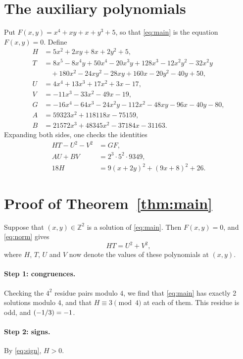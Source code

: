 \documentclass[11pt]{article}
\newcommand{\Z}{\mathbb{Z}}
\newcommand{\leg}[2]{\mathchoice{\biggl(\dfrac{#1}{#2}\biggr)}{(#1/#2)}{(#1/#2)}{(#1/#2)}}
\begin{document}
\section{The auxiliary polynomials}

Put $F(x,y)=x^{4}+xy+x+y^{3}+5$, so that \eqref{eq:main} is the equation $F(x,y)=0$. Define
\begin{align*}
H&=5x^{2}+2xy+8x+2y^{2}+5,\\
T&=8x^{5}-8x^{4}y+50x^{4}-20x^{3}y+128x^{3}-12x^{2}y^{2}-32x^{2}y\\
&\quad+180x^{2}-24xy^{2}-28xy+160x-20y^{2}-40y+50,\\
U&=4x^{4}+13x^{3}+17x^{2}+3x-17,\\
V&=-11x^{3}-33x^{2}-49x-19,\\
G&=-16x^{4}-64x^{3}-24x^{2}y-112x^{2}-48xy-96x-40y-80,\\
A&=59323x^{2}+118118x-75159,\\
B&=21572x^{3}+48345x^{2}-37184x-31163.
\end{align*}
Expanding both sides, one checks the identities
\begin{align}
HT-U^2-V^2&=GF,\label{eq:norm}\\
AU+BV&=2^{3}\cdot 5^{2}\cdot 9349,\label{eq:bezout}\\
18H&=9(x+2y)^2+(9x+8)^2+26.\label{eq:sign}
\end{align}

\section{Proof of Theorem~\ref{thm:main}}

Suppose that $(x,y)\in\Z^2$ is a solution of \eqref{eq:main}. Then $F(x,y)=0$, and \eqref{eq:norm} gives
\begin{equation}\label{eq:HT}
HT=U^2+V^2,
\end{equation}
where $H$, $T$, $U$ and $V$ now denote the values of these polynomials at $(x,y)$.

\paragraph{Step 1: congruences.} Checking the $4^2$ residue pairs modulo $4$, we find that \eqref{eq:main} has exactly 2 solutions modulo $4$, and that $H\equiv3\pmod{4}$ at each of them. This residue is odd, and $\leg{-1}{3}=-1$.

\paragraph{Step 2: signs.} By \eqref{eq:sign}, $H>0$.
\end{document}
